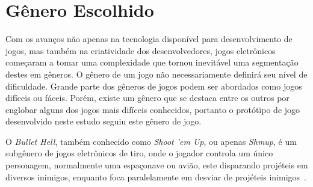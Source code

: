 \section{Gênero Escolhido}

Com os avanços não apenas na tecnologia disponível para desenvolvimento de jogos, mas também na criatividade dos desenvolvedores, jogos eletrônicos começaram a tomar uma complexidade que tornou inevitável uma segmentação destes em gêneros. O gênero de um jogo não necessariamente definirá seu nível de dificuldade. Grande parte dos gêneros de jogos podem ser abordados como jogos difíceis ou fáceis. Porém, existe um gênero que se destaca entre os outros por englobar alguns dos jogos mais difíceis conhecidos, portanto o protótipo de jogo desenvolvido neste estudo seguiu este gênero de jogo.

O \textit{Bullet Hell}, também conhecido como \textit{Shoot 'em Up}, ou apenas \textit{Shmup}, é um subgênero de jogos eletrônicos de tiro, onde o jogador controla um único personagem, normalmente uma espaçonave ou avião, este disparando projéteis em diversos inimigos, enquanto foca paralelamente em desviar de projéteis inimigos~\citep{STG}.
